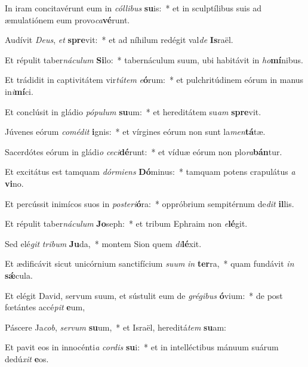 \item In iram concitavérunt eum in \textit{cól}\textit{li}\textit{bus} \textbf{su}is:~* et in sculptílibus suis ad æmulatiónem eum provo\textit{ca}\textbf{vé}runt.
\item Audívit \textit{De}\textit{us}, \textit{et} \textbf{spre}vit:~* et ad níhilum redégit val\textit{de} \textbf{Is}raël.
\item Et répulit taber\textit{ná}\textit{cu}\textit{lum} \textbf{Si}lo:~* tabernáculum suum, ubi habitávit in \textit{ho}\textbf{mí}nibus.
\item Et trádidit in captivitátem vir\textit{tú}\textit{tem} \textit{e}\textbf{ó}rum:~* et pulchritúdinem eórum in manus in\textit{i}\textbf{mí}ci.
\item Et conclúsit in gládio \textit{pó}\textit{pu}\textit{lum} \textbf{su}um:~* et hereditátem su\textit{am} \textbf{spre}vit.
\item Júvenes eórum \textit{com}\textit{é}\textit{dit} \textbf{i}gnis:~* et vírgines eórum non sunt la\textit{men}\textbf{tá}tæ.
\item Sacerdótes eórum in gládi\textit{o} \textit{ce}\textit{ci}\textbf{dé}runt:~* et víduæ eórum non plo\textit{ra}\textbf{bán}tur.
\item Et excitátus est tamquam \textit{dór}\textit{mi}\textit{ens} \textbf{Dó}minus:~* tamquam potens crapulátus \textit{a} \textbf{vi}no.
\item Et percússit inimícos suos in \textit{post}\textit{e}\textit{ri}\textbf{ó}ra:~* oppróbrium sempitérnum de\textit{dit} \textbf{il}lis.
\item Et répulit taber\textit{ná}\textit{cu}\textit{lum} \textbf{Jo}seph:~* et tribum Ephraim non \textit{e}\textbf{lé}git.
\item Sed elé\textit{git} \textit{tri}\textit{bum} \textbf{Ju}da,~* montem Sion quem \textit{di}\textbf{lé}xit.
\item Et ædificávit sicut unicórnium sanctifícium \textit{su}\textit{um} \textit{in} \textbf{ter}ra,~* quam fundávit \textit{in} \textbf{sǽ}cula.
\item Et elégit David, servum suum, et sústulit eum de \textit{gré}\textit{gi}\textit{bus} \textbf{ó}vium:~* de post fœtántes accé\textit{pit} \textbf{e}um,
\item Páscere Ja\textit{cob}, \textit{ser}\textit{vum} \textbf{su}um,~* et Israël, hereditá\textit{tem} \textbf{su}am:
\item Et pavit eos in innocénti\textit{a} \textit{cor}\textit{dis} \textbf{su}i:~* et in intelléctibus mánuum suárum dedú\textit{xit} \textbf{e}os.
